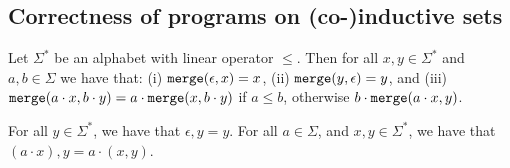 






\subsection{Correctness of programs on (co-)inductive sets}
\begin{definition}[$\merges$] Let $\Sigma^*$ be an alphabet with linear operator $\leq$. Then for all $x,y \in \Sigma^*$ and $a,b \in \Sigma$ we have that: (i) $\mathtt{merge}(\epsilon, x) = x$, (ii) $\mathtt{merge}(y, \epsilon) = y$, and (iii) $\mathtt{merge}(a\cdot x, b\cdot y) = a\cdot \mathtt{merge}(x, b\cdot y)$ if $a \leq b$, otherwise $b\cdot \mathtt{merge}(a\cdot x, y)$.
\end{definition}

\begin{definition}[Concatenation]
  \label{cl4:def:concat}
For all $y \in \Sigma^*$, we have that $\epsilon,y = y$.
For all $a \in \Sigma$, and $x,y \in \Sigma^*$, we have that $(a\cdot x), y = a \cdot (x,y)$.
  
\end{definition}

\begin{definition}
    \label{cl4:def2}
\end{definition}

